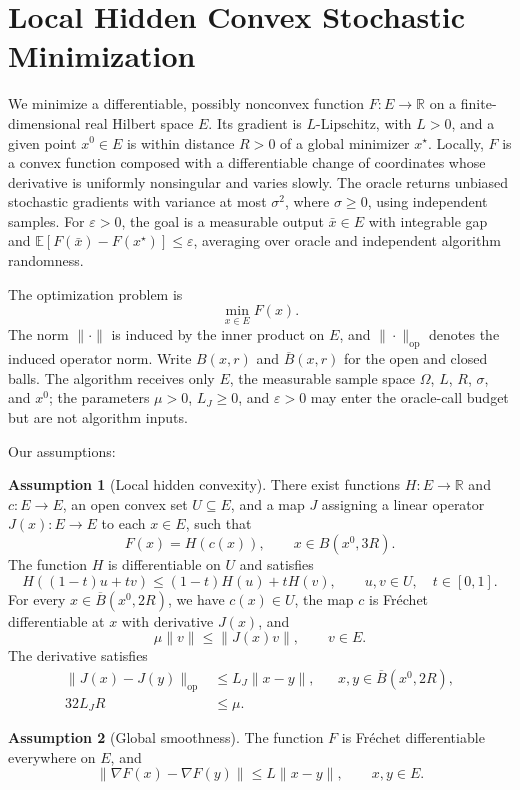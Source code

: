 \documentclass[10pt]{article}
\theoremstyle{definition}
\newtheorem{assumption}{Assumption}
\begin{document}
\section*{Local Hidden Convex Stochastic Minimization}
We minimize a differentiable, possibly nonconvex function $F:E\to\mathbb{R}$ on a finite-dimensional real Hilbert space $E$. Its gradient is $L$-Lipschitz, with $L>0$, and a given point $x^0\in E$ is within distance $R>0$ of a global minimizer $x^\star$. Locally, $F$ is a convex function composed with a differentiable change of coordinates whose derivative is uniformly nonsingular and varies slowly. The oracle returns unbiased stochastic gradients with variance at most $\sigma^2$, where $\sigma\geq0$, using independent samples. For $\varepsilon>0$, the goal is a measurable output $\bar{x}\in E$ with integrable gap and $\mathbb{E}[F(\bar{x})-F(x^\star)]\leq\varepsilon$, averaging over oracle and independent algorithm randomness.

The optimization problem is
\[
\min_{x\in E} F(x).
\]
The norm $\|\cdot\|$ is induced by the inner product on $E$, and $\|\cdot\|_{\mathrm{op}}$ denotes the induced operator norm. Write $B(x,r)$ and $\overline B(x,r)$ for the open and closed balls. The algorithm receives only $E$, the measurable sample space $\Omega$, $L$, $R$, $\sigma$, and $x^0$; the parameters $\mu>0$, $L_J\geq0$, and $\varepsilon>0$ may enter the oracle-call budget but are not algorithm inputs.

Our assumptions:
\begin{assumption}[Local hidden convexity]
There exist functions $H:E\to\mathbb{R}$ and $c:E\to E$, an open convex set $U\subseteq E$, and a map $J$ assigning a linear operator $J(x):E\to E$ to each $x\in E$, such that
\[
F(x)=H(c(x)),\qquad x\in B(x^0,3R).
\]
The function $H$ is differentiable on $U$ and satisfies
\[
H((1-t)u+tv)\leq(1-t)H(u)+tH(v),
\qquad u,v\in U,\quad t\in[0,1].
\]
For every $x\in\overline B(x^0,2R)$, we have $c(x)\in U$, the map $c$ is Fr\'echet differentiable at $x$ with derivative $J(x)$, and
\[
\mu\|v\|\leq\|J(x)v\|,\qquad v\in E.
\]
The derivative satisfies
\[
\begin{aligned}
\|J(x)-J(y)\|_{\mathrm{op}}&\leq L_J\|x-y\|,
&&x,y\in\overline B(x^0,2R),\\
32L_JR&\leq\mu.
\end{aligned}
\]
\end{assumption}

\begin{assumption}[Global smoothness]
The function $F$ is Fr\'echet differentiable everywhere on $E$, and
\[
\|\nabla F(x)-\nabla F(y)\|\leq L\|x-y\|,
\qquad x,y\in E.
\]
\end{assumption}
\end{document}
